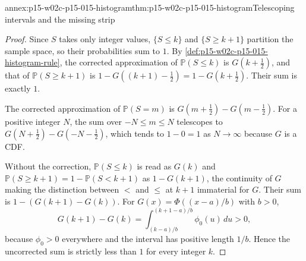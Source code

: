 \begin{annexitem}{annex:p15-w02c-p15-015-histogram}{thm:p15-w02c-p15-015-histogram}{Telescoping intervals and the missing strip}
\begin{proof}
Since \(S\) takes only integer values, \(\{S\leq k\}\) and
\(\{S\geq k+1\}\) partition the sample space, so their probabilities
sum to \(1\). By \cref{def:p15-w02c-p15-015-histogram-rule}, the
corrected approximation of \(\mathbb P(S\leq k)\) is \(G(k+\frac12)\),
and that of \(\mathbb P(S\geq k+1)\) is
\(1-G((k+1)-\frac12)=1-G(k+\frac12)\). Their sum is exactly \(1\).

The corrected approximation of \(\mathbb P(S=m)\) is
\(G(m+\frac12)-G(m-\frac12)\). For a positive integer \(N\), the sum
over \(-N\leq m\leq N\) telescopes to \(G(N+\frac12)-G(-N-\frac12)\),
which tends to \(1-0=1\) as \(N\to\infty\) because \(G\) is a CDF.

Without the correction, \(\mathbb P(S\leq k)\) is read as \(G(k)\) and
\(\mathbb P(S\geq k+1)=1-\mathbb P(S<k+1)\) as \(1-G(k+1)\), the
continuity of \(G\) making the distinction between \(<\) and \(\leq\)
at \(k+1\) immaterial for \(G\). Their sum is
\(1-(G(k+1)-G(k))\). For \(G(x)=\Phi((x-a)/b)\) with \(b>0\),
\[
 G(k+1)-G(k)=\int_{(k-a)/b}^{(k+1-a)/b}\phi_0(u)\,du>0,
\]
because \(\phi_0>0\) everywhere and the interval has positive length
\(1/b\). Hence the uncorrected sum is strictly less than \(1\) for every
integer \(k\).
\end{proof}
\end{annexitem}

